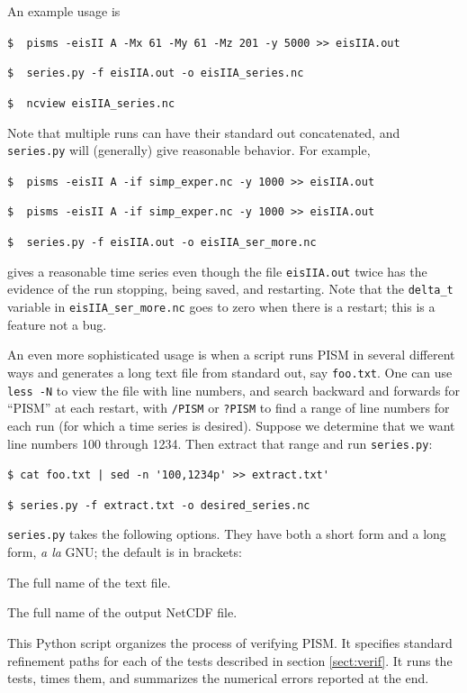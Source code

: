 \documentclass[11pt,final]{amsart}
\newcommand{\und}{\_\!\_}
\begin{document}
An example usage is

\verb|$  pisms -eisII A -Mx 61 -My 61 -Mz 201 -y 5000 >> eisIIA.out|

\verb|$  series.py -f eisIIA.out -o eisIIA_series.nc|

\verb|$  ncview eisIIA_series.nc|

\noindent Note that multiple runs can have their standard out concatenated, and \verb|series.py| will (generally) give reasonable behavior.  For example,

\verb|$  pisms -eisII A -if simp_exper.nc -y 1000 >> eisIIA.out|

\verb|$  pisms -eisII A -if simp_exper.nc -y 1000 >> eisIIA.out|

\verb|$  series.py -f eisIIA.out -o eisIIA_ser_more.nc|

\noindent gives a reasonable time series even though the file \verb|eisIIA.out| twice has the evidence of the run stopping, being saved, and restarting.  Note that the \verb|delta_t| variable in \verb|eisIIA_ser_more.nc| goes to zero when there is a restart; this is a feature not a bug.

An even more sophisticated usage is when a script runs PISM in several different ways and generates a long text file from standard out, say \verb|foo.txt|.  One can use \verb|less -N| to view the file with line numbers, and search backward and forwards  for ``PISM'' at each restart, with \verb|/PISM| or  \verb|?PISM| to find a range of line numbers for each run (for which a time series is desired).  Suppose we determine that we want line numbers 100 through 1234.  Then extract that range and run \verb|series.py|:

\verb#$ cat foo.txt | sed -n '100,1234p' >> extract.txt'# 

\verb|$ series.py -f extract.txt -o desired_series.nc|

\opthead  \verb|series.py| takes the following options.  They have both a short form and a long form, \emph{a la} GNU; the default is in brackets:

 The full name of the text file.

\scriptoptdef{o}{out}{series\und out.nc} The full name of the output NetCDF file.


  This Python script organizes the process of verifying PISM.  It specifies standard refinement paths for each of the tests described in section \ref{sect:verif}.  It runs the tests, times them, and summarizes the numerical errors reported at the end.
\end{document}
